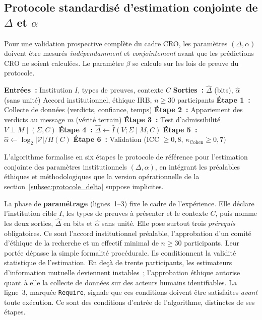 \subsection{Protocole standardis\'e d'estimation conjointe de $\Delta$ et $\alpha$}
\label{subsec:protocole_conjoint}
\begin{sloppypar}
Pour une validation prospective compl\`ete du cadre CRO, les
param\`etres $(\Delta, \alpha)$ doivent \^etre mesur\'es
\emph{ind\'ependamment} et \emph{conjointement} avant que les pr\'edictions
CRO ne soient calcul\'ees. Le param\`etre $\beta$ se calcule sur les lois de preuve du protocole.

\begin{algorithm}[H]
\caption{Protocole standardis\'e d'estimation conjointe de
         $(\hat\Delta, \hat\alpha)$~\cite{MINKA2026CRO}}
\label{alg:estimation_conjointe}
\begin{algorithmic}[1]
\State \textbf{Entr\'ees~:} Institution $I$, types de preuves, contexte $C$
\State \textbf{Sorties~:} $\hat\Delta$ (bits), $\hat\alpha$ (sans unit\'e)
\Require Accord institutionnel, \'ethique IRB, $n \geq 30$ participants
\State \textbf{\'Etape 1~:} Collecte de donn\'ees (verdicts, confiance, temps)
\State \textbf{\'Etape 2~:} Appariement des verdicts au message $m$ (v\'erit\'e terrain)
\State \textbf{\'Etape 3~:} Test d'admissibilit\'e $V \perp M \mid (\Sigma,C)$
\State \textbf{\'Etape 4~:} $\hat\Delta \leftarrow \hat I(V;\Sigma \mid M,C)$
\State \textbf{\'Etape 5~:} $\hat\alpha \leftarrow \log_2|\mathcal{V}| / H(C)$
\State \textbf{\'Etape 6~:} Validation (ICC $\geq 0{,}8$, $\kappa_{\mathrm{Cohen}} \geq 0{,}7$)
\end{algorithmic}
\end{algorithm}

L'algorithme formalise en six \'etapes le protocole de r\'ef\'erence pour
l'estimation conjointe des param\`etres institutionnels $(\Delta, \alpha)$,
en int\'egrant les pr\'ealables \'ethiques et
m\'ethodologiques que la version op\'erationnelle de la
section~\ref{subsec:protocole_delta} suppose implicites.

La phase de \textbf{param\'etrage} (lignes~1--3) fixe le cadre de
l'exp\'erience. Elle d\'eclare l'institution cible $I$, les types de
preuves \`a pr\'esenter et le contexte $C$, puis nomme les deux sorties,
$\hat\Delta$ en bits et $\hat\alpha$ sans unit\'e. Elle pose surtout trois
\emph{pr\'erequis} obligatoires. Ce sont l'accord institutionnel pr\'ealable,
l'approbation d'un comit\'e d'\'ethique de la recherche et un effectif
minimal de $n \geq 30$ participants. Leur port\'ee d\'epasse la simple formalit\'e
proc\'edurale. Ils conditionnent la validit\'e statistique de
l'estimation. En de\c{c}\`a de trente participants, les estimateurs
d'information mutuelle deviennent instables~; l'approbation \'ethique
autorise quant \`a elle la collecte de donn\'ees sur des acteurs humains
identifiables. La ligne~3, marqu\'ee \texttt{Require}, signale que ces
conditions doivent \^etre satisfaites \emph{avant} toute ex\'ecution. Ce sont des conditions d'entr\'ee de l'algorithme, distinctes de ses \'etapes.


\end{sloppypar}
